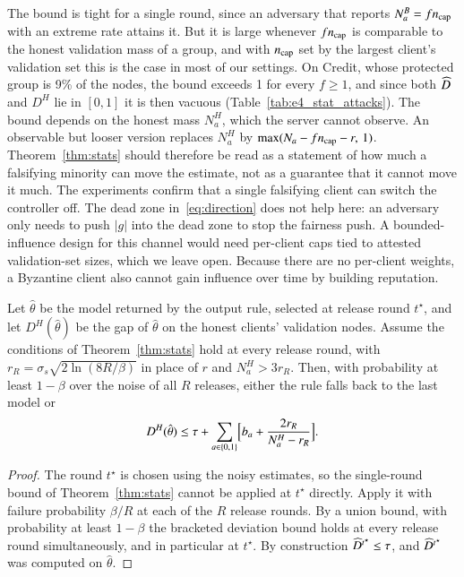 The bound is tight for a single round, since an adversary that reports $N^B_a=fn_{\mathrm{cap}}$ with an extreme rate attains it. But it is large whenever $fn_{\mathrm{cap}}$ is comparable to the honest validation mass of a group, and with $n_{\mathrm{cap}}$ set by the largest client's validation set this is the case in most of our settings. On Credit, whose protected group is 9\% of the nodes, the bound exceeds 1 for every $f\ge1$, and since both $\widehat{D}$ and $D^H$ lie in $[0,1]$ it is then vacuous (Table~\ref{tab:e4_stat_attacks}). The bound depends on the honest mass $N^H_a$, which the server cannot observe. An observable but looser version replaces $N^H_a$ by $\max(N_a-fn_{\mathrm{cap}}-r,\,1)$. Theorem~\ref{thm:stats} should therefore be read as a statement of how much a falsifying minority can move the estimate, not as a guarantee that it cannot move it much. The experiments confirm that a single falsifying client can switch the controller off. The dead zone in~\eqref{eq:direction} does not help here: an adversary only needs to push $|g|$ into the dead zone to stop the fairness push. A bounded-influence design for this channel would need per-client caps tied to attested validation-set sizes, which we leave open. Because there are no per-client weights, a Byzantine client also cannot gain influence over time by building reputation.

\begin{proposition}\label{prop:output}
Let $\hat\theta$ be the model returned by the output rule, selected at release round $t^\star$, and let $D^H(\hat\theta)$ be the gap of $\hat\theta$ on the honest clients' validation nodes. Assume the conditions of Theorem~\ref{thm:stats} hold at every release round, with $r_R=\sigma_s\sqrt{2\ln(8R/\beta)}$ in place of $r$ and $N^H_a>3r_R$. Then, with probability at least $1-\beta$ over the noise of all $R$ releases, either the rule falls back to the last model or
\begin{equation}\label{eq:output}
D^H(\hat\theta)\le\tau+\sum_{a\in\{0,1\}}\Bigl[b_a+\frac{2r_R}{N^H_a-r_R}\Bigr].
\end{equation}
\end{proposition}

\begin{proof}
The round $t^\star$ is chosen using the noisy estimates, so the single-round bound of Theorem~\ref{thm:stats} cannot be applied at $t^\star$ directly. Apply it with failure probability $\beta/R$ at each of the $R$ release rounds. By a union bound, with probability at least $1-\beta$ the bracketed deviation bound holds at every release round simultaneously, and in particular at $t^\star$. By construction $\widehat{D}^{t^\star}\le\tau$, and $\widehat{D}^{t^\star}$ was computed on $\hat\theta$.
\end{proof}


